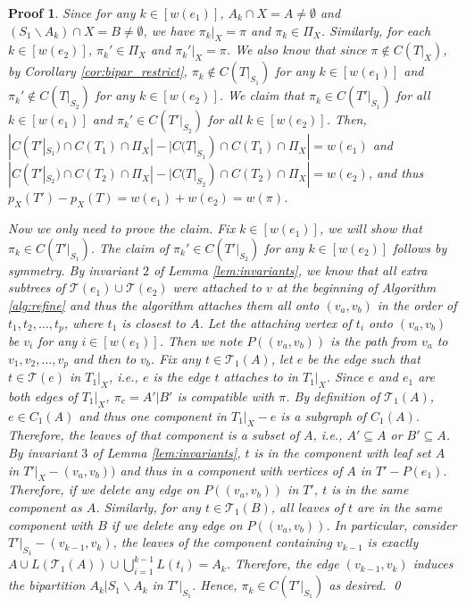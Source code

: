 \documentclass{bmcart}
\theoremstyle{mystyle}
\theoremstyle{proofstyle}
\newtheorem*{proof2}{Proof}
\newenvironment{proofnospace}{\begin{proof2}}{\qed \end{proof2}}
\begin{document}
\begin{proofnospace}
    Since for any $k \in [w(e_1)]$, $A_k \cap X = A \neq \emptyset$ and $(S_1 \backslash A_k) \cap X = B \neq \emptyset$, we have $\pi_k |_X = \pi$ and $\pi_k \in \Pi_X$. Similarly, for each $k \in [w(e_2)]$, $\pi_k' \in \Pi_X$ and $\pi_k'|_X = \pi$. We also know that since $\pi \notin C(T|_X)$, by Corollary \ref{cor:bipar_restrict}, $\pi_k \notin C(T|_{S_1})$ for any $k \in [w(e_1)]$ and $\pi_k' \notin C(T|_{S_2})$ for any $k \in [w(e_2)]$. We claim that $\pi_k \in C(T'|_{S_1})$ for all $k \in [w(e_1)]$ and $\pi_k' \in C(T'|_{S_2})$ for all $k \in [w(e_2)]$. Then, $|C(T'|_{S_1})\cap C(T_1) \cap \Pi_X| - |C(T|_{S_1})\cap C(T_1) \cap \Pi_X| = w(e_1)$ and $|C(T'|_{S_2}) \cap C(T_2) \cap \Pi_X| - |C(T|_{S_2}) \cap C(T_2) \cap \Pi_X| = w(e_2)$, and thus $p_X(T') - p_X(T) = w(e_1) + w(e_2) = w(\pi)$. \smallskip
    
    Now we only need to prove the claim. Fix $k \in [w(e_1)]$, we will show that $\pi_k \in C(T'|_{S_1})$. The claim of $\pi_k' \in C(T'|_{S_2})$ for any $k \in [w(e_2)]$ follows by symmetry.  By invariant $2$ of Lemma \ref{lem:invariants}, we know that all extra subtrees of $\mathcal{T}(e_1) \cup \mathcal{T}(e_2)$ were attached to $v$ at the beginning of Algorithm \ref{alg:refine} and thus the algorithm attaches them all onto $(v_a, v_b)$ in the order of $t_1,t_2,\dots,t_p$, where $t_1$ is closest to $A$. Let the attaching vertex of $t_i$ onto $(v_a, v_b)$ be $v_i$ for any $i \in [w(e_1)]$. Then we note $P( (v_a,v_b) )$ is the path from $v_a$ to $v_1,v_2,\dots, v_p$ and then to $v_b$. Fix any $t \in \mathcal{T}_1(A)$, let $e$ be the edge such that $t \in \mathcal{T}(e)$ in $T_1|_X$, i.e., $e$ is the edge $t$ attaches to in $T_1|_X$. Since $e$ and $e_1$ are both edges of $T_1|_X$, $\pi_e = A'|B'$ is compatible with $\pi$. By definition of $\mathcal{T}_1(A)$, $e \in C_1(A)$ and thus one component in $T_1|_X - e$ is a subgraph of $C_1(A)$. Therefore, the leaves of that component is a subset of $A$, i.e., $A' \subseteq A$ or $B' \subseteq A$. By invariant $3$ of Lemma \ref{lem:invariants}, $t$ is in the component with leaf set $A$ in $T'|_X - (v_a,v_b))$ and thus in a component with vertices of $A$ in $T'-P(e_1)$. Therefore, if we delete any edge on $P( (v_a,v_b) )$ in $T'$, $t$ is in the same component as $A$. Similarly, for any $t \in \mathcal{T}_1(B)$, all leaves of $t$ are in the same component with $B$ if we delete any edge on $P( (v_a,v_b) )$. In particular, consider $T'|_{S_1} - (v_{k-1}, v_k)$, the leaves of the component containing $v_{k-1}$ is exactly $A \cup L(\mathcal{T}_1(A)) \cup  \bigcup_{i = 1}^{k-1}L(t_i) = A_k$. Therefore, the edge $(v_{k-1},v_k)$ induces the bipartition $A_k | S_1 \backslash A_k$ in $T'|_{S_1}$. Hence, $\pi_k \in C(T'|_{S_1})$ as desired. 
\end{proofnospace}
\end{document}
